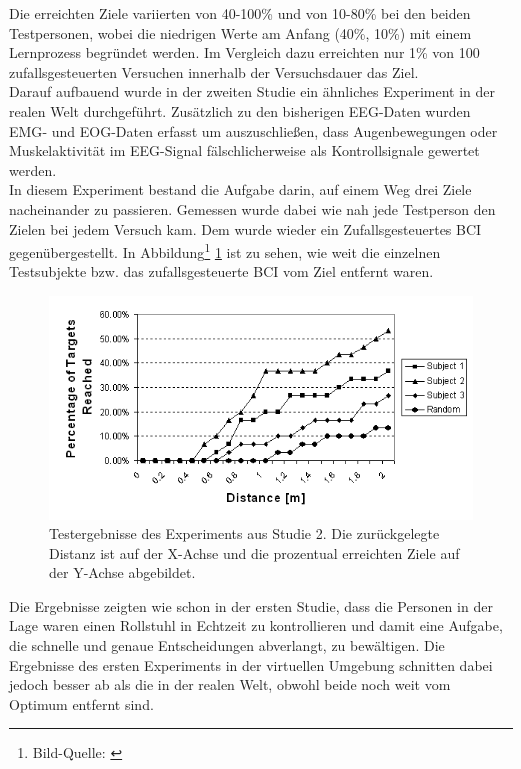 Die erreichten Ziele variierten von 40-100\% und von 10-80\% bei den beiden Testpersonen, wobei die niedrigen Werte am Anfang (40\%, 10\%) mit einem Lernprozess begründet werden. 
Im Vergleich dazu erreichten nur 1\% von 100 zufallsgesteuerten Versuchen innerhalb der Versuchsdauer das Ziel. \\

Darauf aufbauend wurde in der zweiten Studie ein ähnliches Experiment in der realen Welt durchgeführt.
Zusätzlich zu den bisherigen EEG-Daten wurden \ac{EMG}- und \ac{EOG}-Daten erfasst um auszuschließen, 
dass Augenbewegungen oder Muskelaktivität im EEG-Signal fälschlicherweise als Kontrollsignale gewertet werden.\\

In diesem Experiment bestand die Aufgabe darin, auf einem Weg drei Ziele nacheinander zu passieren.
Gemessen wurde dabei wie nah jede Testperson den Zielen bei jedem Versuch kam.
Dem wurde wieder ein Zufallsgesteuertes BCI gegenübergestellt. 
In Abbildung\footnote[1]{Bild-Quelle: \cite[S.8]{wheelchairBCI3}} \ref{WheelchairResults} ist zu sehen, wie weit die einzelnen Testsubjekte bzw. das zufallsgesteuerte BCI vom Ziel entfernt waren.\\

\begin{figure}[h!]
\begin{center}
\includegraphics[scale=0.85]{images/WheelchairResults2.png}
\caption{Testergebnisse des Experiments aus Studie 2. Die zurückgelegte Dis\-tanz ist auf der X-Achse und die prozentual erreichten Ziele auf der Y-Achse abgebildet.}
\label{WheelchairResults}
\end{center}
\end{figure}


Die Ergebnisse zeigten wie schon in der ersten Studie, dass die Personen in der Lage waren einen Rollstuhl in Echtzeit zu kontrollieren 
und damit eine Aufgabe, die schnelle und genaue Entscheidungen abverlangt, zu bewältigen. 
Die Ergebnisse des ersten Experiments in der virtuellen Umgebung schnitten dabei jedoch besser ab als die in der realen Welt, obwohl beide noch weit vom Optimum entfernt sind.











